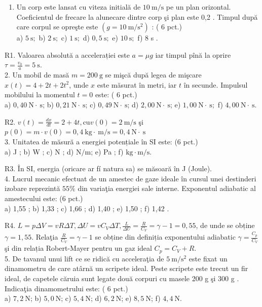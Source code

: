 
\begin{enumerate}
  \item Un corp este lansat cu viteza initială de $10 \mathrm{~m} / \mathrm{s}$ pe un plan orizontal. Coeficientul de frecare la alunecare dintre corp şi plan este 0,2 . Timpul după care corpul se opreşte este $\left(g=10 \mathrm{~m} / \mathrm{s}^{2}\right)$ : ( 6 pct.)\\
a) $5 \mathrm{~s} ;$ b) $2 \mathrm{~s} ;$ c) $1 \mathrm{~s} ;$ d) $0,5 \mathrm{~s} ;$ e) $10 \mathrm{~s} ;$ f) 8 s .
\end{enumerate}

R1. Valoarea absolută a accelerației este $a=\mu g$ iar timpul pînă la oprire $\tau=\frac{v_{0}}{a}=5 \mathrm{~s}$.\\
2. Un mobil de masă $m=200 \mathrm{~g}$ se mişcă după legea de mişcare $x(t)=4+2 t+2 t^{2}$, unde $x$ este măsurat în metri, iar $t$ în secunde. Impulsul mobilului la momentul $t=0$ este: ( 6 pct.)\\
a) $0,40 \mathrm{~N} \cdot \mathrm{~s}$; b) $0,21 \mathrm{~N} \cdot \mathrm{~s}$; c) $0,49 \mathrm{~N} \cdot \mathrm{~s}$; d) $2,00 \mathrm{~N} \cdot \mathrm{~s}$; e) $1,00 \mathrm{~N} \cdot \mathrm{~s} ;$ f) $4,00 \mathrm{~N} \cdot \mathrm{~s}$.

R2. $v(t)=\frac{d x}{d t}=2+4 t, \mathrm{cu} v(0)=2 \mathrm{~m} / \mathrm{s}$ şi $p(0)=m \cdot v(0)=0,4 \mathrm{~kg} \cdot \mathrm{~m} / \mathrm{s}=0,4 \mathrm{~N} \cdot \mathrm{~s}$\\
3. Unitatea de măsură a energiei potențiale în SI este: (6 pct.)\\
a) J ; b) W ; c) N ; d) $\mathrm{N} / \mathrm{m}$; e) Pa ; f) $\mathrm{kg} \cdot \mathrm{m} / \mathrm{s}$.

R3. În SI, energia (oricare ar fí natura sa) se măsoară în J (Joule).\\
4. Lucrul mecanic efectuat de un amestec de gaze ideale în cursul unei destinderi izobare reprezintă $55 \%$ din variaţia energiei sale interne. Exponentul adiabatic al amestecului este: (6 pct.)\\
a) 1,55 ; b) 1,33 ; c) 1,66 ; d) 1,40 ; e) 1,50 ; f) 1,42 .

R4. $L=p \Delta V=v R \Delta T, \Delta U=v C_{V} \Delta T, \frac{L}{\Delta U}=\frac{R}{C_{V}}=\gamma-1=0,55$, de unde se obține $\gamma=1,55$. Relaţia $\frac{R}{C_{V}}=\gamma-1$ se obține din definiția exponentului adiabatic $\gamma=\frac{C_{p}}{C_{V}}$ şi din relația Robert-Mayer pentru un gaz ideal $C_{p}=C_{V}+R$.\\
5. De tavanul unui lift ce se ridică cu acceleraţia de $5 \mathrm{~m} / \mathrm{s}^{2}$ este fixat un dinamometru de care atârnă un scripete ideal. Peste scripete este trecut un fir ideal, de capetele căruia sunt legate două corpuri cu masele 200 g şi 300 g . Indicaţia dinamometrului este: ( 6 pct.)\\
a) $7,2 \mathrm{~N}$; b) $5,0 \mathrm{~N}$; c) $5,4 \mathrm{~N}$; d) $6,2 \mathrm{~N}$; e) $8,5 \mathrm{~N}$; f) $4,4 \mathrm{~N}$.

